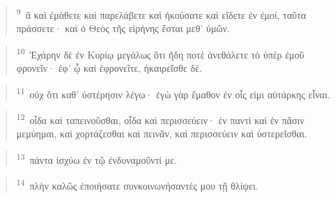 \documentclass{article}
\newcommand{\currentverse}{1} %
\newcommand{\setcurrentverse}[1]{\renewcommand{\currentverse}{#1}}
\begin{document}
\begin{verse}

\setcurrentverse{9}

\setcounter{footnote}{0}

\textsuperscript{9}~ἃ καὶ ἐμάθετε καὶ παρελάβετε καὶ ἠκούσατε καὶ εἴδετε ἐν ἐμοί, ταῦτα πράσσετε· καὶ ὁ Θεὸς τῆς εἰρήνης ἔσται μεθ’ ὑμῶν.

\end{verse}

\begin{verse}

\setcurrentverse{10}

\setcounter{footnote}{0}

\textsuperscript{10}~Ἐχάρην δὲ ἐν Κυρίῳ μεγάλως ὅτι ἤδη ποτὲ ἀνεθάλετε τὸ ὑπὲρ ἐμοῦ φρονεῖν· ἐφ’ ᾧ καὶ ἐφρονεῖτε, ἠκαιρεῖσθε δέ.

\end{verse}

\begin{verse}

\setcurrentverse{11}

\setcounter{footnote}{0}

\textsuperscript{11}~οὐχ ὅτι καθ’ ὑστέρησιν λέγω· ἐγὼ γὰρ ἔμαθον ἐν οἷς εἰμι αὐτάρκης εἶναι.

\end{verse}

\begin{verse}

\setcurrentverse{12}

\setcounter{footnote}{0}

\textsuperscript{12}~οἶδα καὶ ταπεινοῦσθαι, οἶδα καὶ περισσεύειν· ἐν παντὶ καὶ ἐν πᾶσιν μεμύημαι, καὶ χορτάζεσθαι καὶ πεινᾶν, καὶ περισσεύειν καὶ ὑστερεῖσθαι.

\end{verse}

\begin{verse}

\setcurrentverse{13}

\setcounter{footnote}{0}

\textsuperscript{13}~πάντα ἰσχύω ἐν τῷ ἐνδυναμοῦντί με.

\end{verse}

\begin{verse}

\setcurrentverse{14}

\setcounter{footnote}{0}

\textsuperscript{14}~πλὴν καλῶς ἐποιήσατε συνκοινωνήσαντές μου τῇ θλίψει.

\end{verse}
\end{document}
